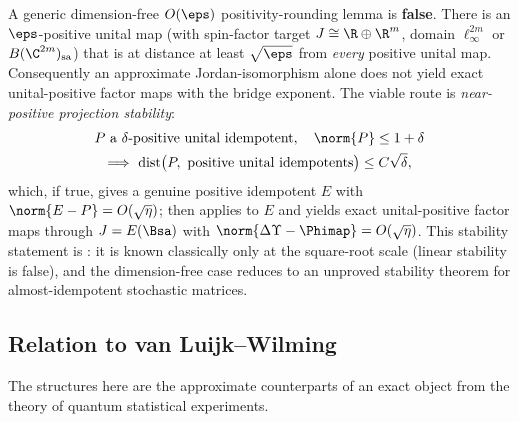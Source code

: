 \begin{remark}
\label{rem:rounding}
A generic dimension-free $O(\eps)$ positivity-rounding lemma is \textbf{false}.
There is an $\eps$-positive unital map (with spin-factor target $J\cong\R\oplus\R^m$,
domain $\ell_\infty^{2m}$ or $B(\C^{2m})_{\mathrm{sa}}$) that is at distance at
least $\sqrt\eps$ from \emph{every} positive unital map. Consequently an
approximate Jordan-isomorphism alone does not yield exact unital-positive factor
maps with the bridge exponent. The viable route is \emph{near-positive
projection stability}:
\[
  \begin{gathered}
  P\ \text{a }\delta\text{-positive unital idempotent},\quad \norm{P}\le1+\delta\\
  \Longrightarrow\
  \mathrm{dist}\bigl(P,\ \text{positive unital idempotents}\bigr)\le C\sqrt\delta,
  \end{gathered}
\]
which, if true, gives a genuine positive idempotent $E$ with
$\norm{E-P}=O(\sqrt\eta)$;  then applies to $E$ and
yields exact unital-positive factor maps through $J=E(\Bsa)$ with
$\norm{\Delta\Upsilon-\Phimap}=O(\sqrt\eta)$. This stability statement is
\status{(open)}: it is known classically only at the square-root scale (linear
stability is false), and the dimension-free case reduces to an unproved
stability theorem for almost-idempotent stochastic matrices.
\end{remark}

\subsection{Relation to van Luijk--Wilming}

The structures here are the approximate counterparts of an exact object from the
theory of quantum statistical experiments.

